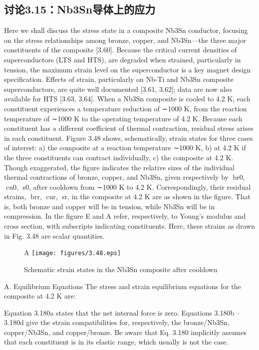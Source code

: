 \subsection{讨论3.15：Nb3Sn导体上的应力}
Here we shall discuss the stress state in a composite Nb3Sn conductor, focusing on
the stress relationships among bronze, copper, and Nb3Sn—the three major constituents of the composite [3.60]. Because the critical current densities of superconductors (LTS and HTS), are degraded when strained, particularly in tension, the
maximum strain level on the superconductor is a key magnet design specification.
Effects of strain, particularly on Nb-Ti and Nb3Sn composite superconductors, are
quite well documented [3.61, 3.62]; data are now also available for HTS [3.63, 3.64].
When a Nb3Sn composite is cooled to 4.2 K, each constituent experiences a temperature reduction of ∼1000 K, from the reaction temperature of ∼1000 K to the
operating temperature of 4.2 K. Because each constituent has a different coefficient
of thermal contraction, residual stress arises in each constituent.
Figure 3.48 shows, schematically, strain states for three cases of interest: a) the
composite at a reaction temperature ∼1000 K, b) at 4.2 K if the three constituents
can contract individually, c) the composite at 4.2 K. Though exaggerated, the figure indicates the relative sizes of the individual thermal contractions of bronze,
copper, and Nb3Sn, given respectively by br0, cu0, s0, after cooldown from
∼1000 K to 4.2 K. Correspondingly, their residual strains, brr, cur, sr, in the
composite at 4.2 K are as shown in the figure. That is, both bronze and copper
will be in tension, while Nb3Sn will be in compression. In the figure E and A refer, respectively, to Young’s modulus and cross section, with subscripts indicating
constituents. Here, these strains as drawn in Fig. 3.48 are scalar quantities.
\begin{figure}[htbp]A
	\centering
	\texttt{[image: figures/3.48.eps]}
	\caption{Schematic strain states in the Nb3Sn composite after cooldown}
\end{figure}

A. Equilibrium Equations
The stress and strain equilibrium equations for the composite at 4.2 K are:

Equation 3.180a states that the net internal force is zero. Equations 3.180b –3.180d
give the strain compatibilities for, respectively, the bronze/Nb3Sn, copper/Nb3Sn,
and copper/bronze. Be aware that Eq. 3.180 implicitly assumes that each constituent is in its elastic range, which usually is not the case.


